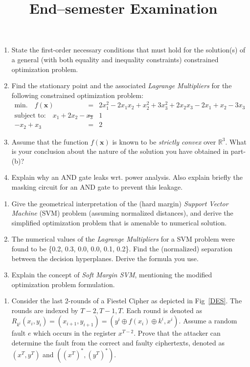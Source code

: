 \documentclass{article}
\title{End--semester Examination}
\begin{document}
\begin{questions}

\question 
\begin{enumerate}
\item State the first-order necessary conditions that must hold for the solution(s) of 
a general (with both equality and inequality constraints) constrained optimization problem. 
\item Find the stationary point and the associated \emph{Lagrange Multipliers} for the 
following constrained optimization problem: 
\begin{eqnarray*}
\text{min.}\quad f(\mathbf{x}) &=&  2x_1^2 -2x_1x_2 + x_2^2 +3x_3^2 + 2x_2x_3 -2x_1 + x_2 - 3 x_3\nonumber \\
\text{subject to:} \quad x_1 + 2x_2 - x_3 &=& 1 \nonumber \\
                   -x_2 + x_3 &=& 2 \nonumber
\end{eqnarray*}                                               
\item Assume that the function $f(\mathbf{x})$ is known to be 
\emph{strictly convex} over $\mathbb{R}^3$. What is your
conclusion about the nature of the solution you have obtained in part-(b)?  
\item Explain why an AND gate leaks wrt. power analysis. Also explain briefly the masking circuit for an AND gate to prevent this leakage. 
\end{enumerate}

\question
\begin{enumerate}
\item Give the geometrical interpretation of the (hard margin) \emph{Support Vector Machine} (SVM) 
problem (assuming normalized distances), and
derive the simplified optimization problem that is amenable to numerical solution. 
\item The numerical values of the \emph{Lagrange Multipliers} for a SVM problem were found
to be \{0.2, 0.3, 0.0, 0.0, 0.1, 0.2\}. Find the (normalized) separation between the decision hyperplanes.
Derive the formula you use. 
\item Explain the concept of \emph{Soft Margin SVM}, mentioning the modified optimization
problem formulation. 
\end{enumerate}

\question 
\begin{enumerate}
\item 
Consider the last 2-rounds of a Fiestel Cipher as depicted in Fig~\ref{DES}. The rounds are indexed by $T-2, T-1, T$. Each round 
is denoted as $R_{k^i}(x_i,y_i)=(x_{i+1},y_{i+1})=(y^i \oplus f(x_i) \oplus k^i,x^i)$. Assume a random fault $e$ which occurs in the register $x^{T-2}$. 
Prove that the attacker can determine the fault from the correct and faulty ciphertexts, denoted as $(x^T,y^T)$ and $((x^T)^*,(y^T)^*)$. 


\end{enumerate}
\end{questions}
\end{document}
